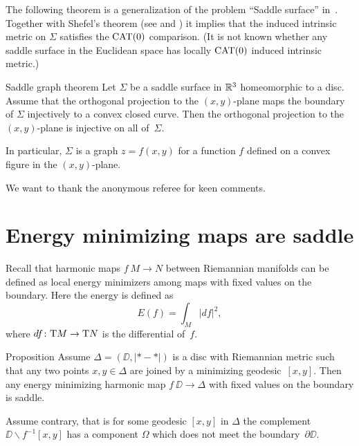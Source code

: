 \documentclass{article}
\begin{document}
The following theorem is a generalization of the problem ``Saddle surface'' in~\cite{petrunin-orthodox}.
Together with Shefel's theorem (see \cite{shefel-3D} and \cite[4.5.5]{akp}) it implies that the induced 
intrinsic metric on $\Sigma$ satisfies the $\mathop{\rm CAT}\nolimits(0)$ comparison. 
(It is not known whether any saddle surface in the Euclidean space has locally $\mathop{\rm CAT}\nolimits(0)$ induced intrinsic metric.)

\begin{thm}{Saddle graph theorem}\label{cor:projection}
Let $\Sigma$ be a saddle surface in $\mathbb{R}^3$ homeomorphic to a disc.
Assume that the orthogonal projection to the $(x,y)$-plane
maps the boundary of $\Sigma$
injectively to a convex closed curve.
Then the orthogonal projection to the $(x,y)$-plane is injective on all of~$\Sigma$.

In particular, $\Sigma$ is a graph $z=f(x,y)$ for a function $f$ defined on a convex figure in the $(x,y)$-plane.
\end{thm}

\medskip

We want to thank the anonymous referee for keen comments.

\section{Energy minimizing maps are saddle}

Recall that harmonic maps $f\:M\to N$ between Riemannian manifolds can be defined as local energy minimizers 
among maps with fixed values on the boundary.
Here the energy is defined as 
\[E(f)=\int_M|df|^2,\]
where $df\colon\mathrm{T} M\to \mathrm{T} N$ is the differential of~$f$.

\begin{thm}{Proposition} 
Assume $\Delta=(\DD,|{*}-{*}|)$ is a disc with Riemannian metric such that any two points $x,y\in\Delta$ are joined by a minimizing geodesic~$[x,y]$.
Then any energy minimizing harmonic map $f\:\DD\to\Delta$ with fixed values on the boundary is saddle.
\end{thm}

Assume contrary, that is for some geodesic $[x,y]$ in $\Delta$ the complement $\DD\backslash f^{-1}[x,y]$ has a component 
$\Omega$ which does not meet the boundary~$\partial\DD$.
\end{document}

